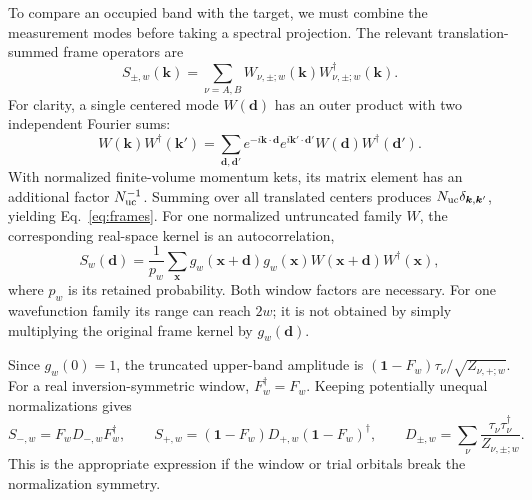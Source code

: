 \documentclass[aps,prb,onecolumn,nofootinbib,superscriptaddress]{revtex4-2}
\newcommand{\id}{\mathbf{1}}
\newcommand{\bk}{\boldsymbol k}
\newcommand{\bd}{\boldsymbol d}
\begin{document}
To compare an occupied band with the target, we must combine the measurement
modes before taking a spectral projection. The relevant translation-summed
frame operators are
\begin{equation}
 S_{\pm,w}(\bk)=\sum_{\nu=A,B}W_{\nu,\pm;w}(\bk)
 W_{\nu,\pm;w}^\dagger(\bk).
 \label{eq:frames}
\end{equation}
For clarity, a single centered mode $W(\bd)$ has an outer product with two
independent Fourier sums:
\begin{equation}
 W(\bk)W^\dagger(\bk')
 =\sum_{\bd,\bd'}e^{-i\bk\cdot\bd}e^{i\bk'\cdot\bd'}
 W(\bd)W^\dagger(\bd').
 \label{eq:both-indices}
\end{equation}
With normalized finite-volume momentum kets, its matrix element has an
additional factor $N_{\rm uc}^{-1}$. Summing over all translated centers
produces $N_{\rm uc}\delta_{\bk,\bk'}$, yielding Eq.~\eqref{eq:frames}.
For one normalized untruncated family $W$, the corresponding real-space
kernel is an autocorrelation,
\begin{equation}
 S_w(\bd)=\frac1{p_w}\sum_{\boldsymbol x}g_w(\boldsymbol x+\bd)g_w(\boldsymbol x)
 W(\boldsymbol x+\bd)W^\dagger(\boldsymbol x),
 \label{eq:autocorrelation}
\end{equation}
where $p_w$ is its retained probability. Both window factors are necessary.
For one wavefunction family its range can reach $2w$; it is not obtained by
simply multiplying the original frame kernel by $g_w(\bd)$.

Since $g_w(0)=1$, the truncated upper-band amplitude is
$(\id-F_w)\tau_\nu/\sqrt{Z_{\nu,+;w}}$. For a real inversion-symmetric
window, $F_w^\dagger=F_w$. Keeping potentially unequal normalizations gives
\begin{equation}
 S_{-,w}=F_wD_{-,w}F_w^\dagger,\qquad
 S_{+,w}=(\id-F_w)D_{+,w}(\id-F_w)^\dagger,\qquad
 D_{\pm,w}=\sum_\nu\frac{\tau_\nu\tau_\nu^\dagger}{Z_{\nu,\pm;w}}.
 \label{eq:general-frame}
\end{equation}
This is the appropriate expression if the window or trial orbitals break the
normalization symmetry.
\end{document}
